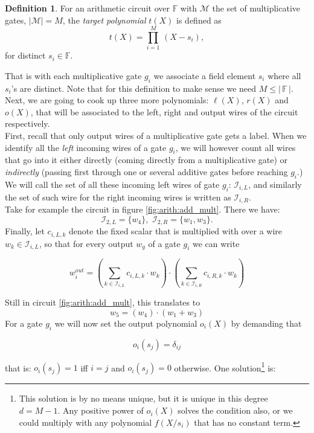 \documentclass[11pt,oneside]{article}
\newcommand{\be}{\begin{equation}}
\newcommand{\ee}{\end{equation}}
\theoremstyle{definition}
\newtheorem{defn}[thm]{Definition}
\theoremstyle{remark}
\numberwithin{equation}{section}
\begin{document}
\begin{defn}\label{def:arith_circ}
For an arithmetic circuit over $\mathbb{F}$ with $\mathcal{M}$ the set of multiplicative gates, $|\mathcal{M}|=M$, the \emph{target polynomial} $t(X)$ is defined as
\be
t(X)=\prod\limits_{i=1}^{M}\,(X-s_i),
\ee
for distinct $s_i\in\mathbb{F}$.
\end{defn}

That is with each multiplicative gate $g_i$ we associate a field element $s_i$
where all $s_i$'s are distinct. Note that for this definition to make sense we
need $M\leq |\,\mathbb{F}\,|$.\\ Next, we are going to cook up three more
polynomials: $\ell(X)$, $r(X)$ and $o(X)$, that will be associated to the left,
right and output wires of the circuit respectively.\\ First, recall that only
output wires of a multiplicative gate gets a label. When we identify all the
\emph{left} incoming wires of a gate $g_i$, we will however count all wires that
go into it either directly (coming directly from a multiplicative gate) or
\emph{indirectly} (passing first through one or several additive gates before
reaching $g_i$.) We will call the set of all these incoming left wires of gate
$g_i$: $\mathcal{I}_{i,L}$, and similarly the set of such wire for the right
incoming wires is written as $\mathcal{I}_{i,R}$.\\ Take for example the circuit
in figure \ref{fig:arith:add_mult}. There we have: $$\mathcal{I}_{2,L} = \{w_4
\},\,\, \mathcal{I}_{2,R} = \{w_1,w_3\}.$$ Finally, let $c_{i,L,k}$ denote the
fixed scalar that is multiplied with over a wire $w_k\in\mathcal{I}_{i,L}$, so
that for every output $w_g$ of a gate $g_i$ we can write

\be
w^{out}_i = \left(\sum\limits_{k\in \mathcal{I}_{i,L}} c_{i,L,k}\cdot w_k
\right)\cdot \left(\sum\limits_{k\in \mathcal{I}_{i,R}} c_{i,R,k}\cdot w_k
\right) 
\ee

Still in circuit \ref{fig:arith:add_mult}, this translates to
$$w_5 = \left(w_4 \right)\cdot \left(w_1+w_3\right)$$
For a gate $g_i$ we will now set the output polynomial $o_i(X)$ by demanding that

\be
o_i(s_j)=\delta_{ij}
\ee

that is: $o_i(s_j)=1$ iff $i=j$ and $o_i(s_j)=0$ otherwise. One
solution\footnote{This solution is by no means unique, but it is unique in this
degree $d=M-1$. Any positive power of $o_i(X)$ solves the condition also, or we
could multiply with any polynomial $f(X/s_i)$ that has no constant term.} is:
\end{document}

